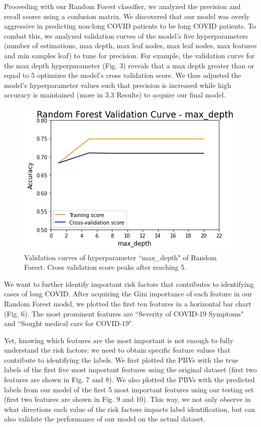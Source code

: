 \documentclass{article}
\begin{document}
Proceeding with our Random Forest classifier, we analyzed the precision and recall scores using a confusion matrix. We discovered that our model was overly aggressive in predicting non-long COVID patients to be long COVID patients. To combat this, we analyzed validation curves of the model's five hyperparameters (number of estimations, max depth, max leaf nodes, max leaf nodes, max features and min samples leaf) to tune for precision. For example, the validation curve for the max depth hyperparameter (Fig. 3) reveals that a max depth greater than or equal to 5 optimizes the model's cross validation score. We thus adjusted the model's hyperparameter values such that precision is increased while high accuracy is maintained (more in 3.3 Results) to acquire our final model.

\begin{figure}[H]
    \center
    \includegraphics[width= \columnwidth]{Figure1.jpeg}
    \caption{Validation curves of hyperparameter ``max\_depth" of Random Forest. Cross validation score peaks after reaching 5.}
    \vspace{-5mm}
  \end{figure}

We want to further identify important risk factors that contributes to identifying cases of long COVID. After acquiring the Gini importance of each feature in our Random Forest model, we plotted the first ten features in a horizontal bar chart (Fig. 6). The most prominent features are ``Severity of COVID-19 Symptoms" and ``Sought medical care for COVID-19". 

Yet, knowing which features are the most important is not enough to fully understand the risk factors: we need to obtain specific feature values that contribute to identifying the labels. We first plotted the PBVs with the true labels of the first five most important features using the original dataset (first two features are shown in Fig. 7 and 8). We also plotted the PBVs with the predicted labels from our model of the first 5 most important features using our testing set (first two features are shown in Fig. 9 and 10). This way, we not only observe in what directions each value of the risk factors impacts label identification, but can also validate the performance of our model on the actual dataset. 
\end{document}
